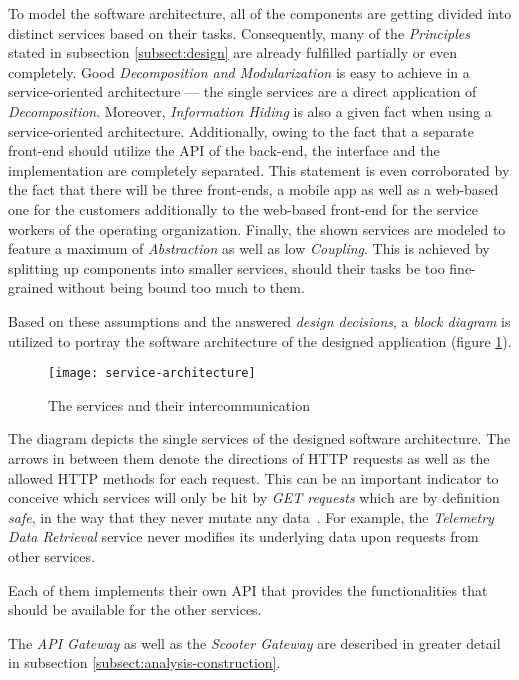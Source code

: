 \documentclass[12pt,a4paper,twoside]{report}
\begin{document}
To model the software architecture, all of the components are getting divided
into distinct services based on their tasks. Consequently, many of the
\textit{Principles} stated in subsection \ref{subsect:design} are already fulfilled
partially or even completely. Good \textit{Decomposition and Modularization} is
easy to achieve in a service-oriented architecture --- the single services
are a direct application of \textit{Decomposition}.
Moreover, \textit{Information Hiding} is also a given fact when using a
service-oriented architecture.
Additionally, owing to the fact that a separate front-end should utilize the API
of the back-end, the interface and the implementation are completely separated.
This statement is even corroborated by the fact that there will be three front-ends,
a mobile app as well as a web-based one for the customers additionally to the
web-based front-end for the service workers of the operating organization.
Finally, the shown services are modeled to feature a maximum of \textit{Abstraction}
as well as low \textit{Coupling}. This is achieved by splitting up components
into smaller services, should their tasks be too fine-grained without being
bound too much to them.

Based on these assumptions and the answered \textit{design decisions},
a \textit{block diagram} is utilized to portray the software architecture of the
designed application (figure \ref{fig:service-architecture}).\\

\begin{figure}[htbp]
\centering
\texttt{[image: service-architecture]}
\caption{The services and their intercommunication}
\label{fig:service-architecture}
\end{figure}

The diagram depicts the single services of the designed software architecture.
The arrows in between them denote the directions of HTTP requests as well
as the allowed HTTP methods for each request.
This can be an important indicator to conceive which services
will only be hit by \textit{GET requests} which are by definition \textit{safe},
in the way that they never mutate any data~\cite{http-rfc}.
For example, the \textit{Telemetry Data Retrieval} service never modifies
its underlying data upon requests from other services.

Each of them implements their own API that provides the functionalities that
should be available for the other services.

The \textit{API Gateway} as well as the \textit{Scooter Gateway} are described
in greater detail in subsection \ref{subsect:analysis-construction}.
\end{document}
